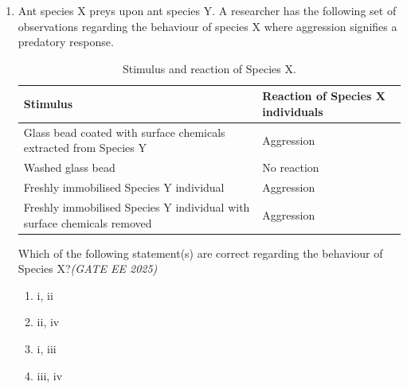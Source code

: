 \documentclass[11pt,a4paper]{article}
\begin{document}
\begin{enumerate}[leftmargin=*,label=\textbf{Q.\arabic*},resume]
\item Ant species X preys upon ant species Y. A researcher has the following set of observations regarding the behaviour of species X where aggression signifies a predatory response.

\begin{table}[h!]
\centering
\begin{tabular}{|p{9cm}|p{5cm}|}
\hline
Stimulus & Reaction of Species X individuals \\
\hline
Glass bead coated with surface chemicals extracted from Species Y & Aggression \\\hline
Washed glass bead & No reaction \\\hline
Freshly immobilised Species Y individual & Aggression \\\hline
Freshly immobilised Species Y individual with surface chemicals removed & Aggression \\
\hline
\end{tabular}
\caption{Stimulus and reaction of Species X.}
\end{table}


Which of the following statement(s) are correct regarding the behaviour of Species X?\hfill \textit{(GATE EE 2025)}
\begin{multicols}{2}
\begin{enumerate}[label=(\Alph*)]
\item i, ii
\item ii, iv
\item i, iii
\item iii, iv
\end{enumerate}
\end{multicols}


\end{enumerate}
\end{document}
